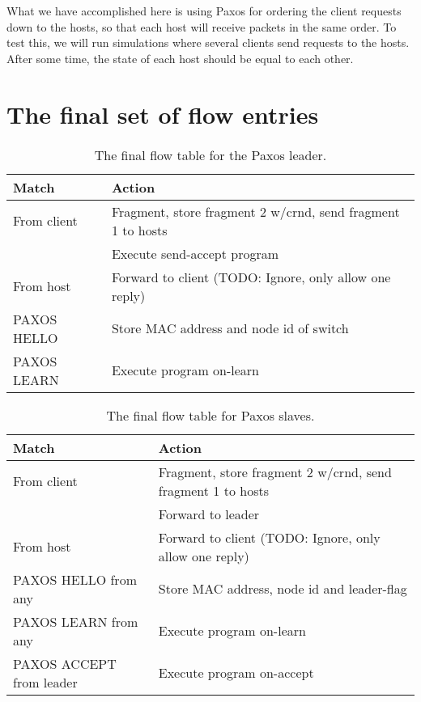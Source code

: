 What we have accomplished here is using Paxos for
ordering the client
requests down to the hosts, so that each host will receive packets in the
same order.  To test this, we will run simulations where several clients
send requests to the hosts. After some time, the state of each host should
be equal to each other.

\section{The final set of flow entries}
\label{chapter:final.flowtable}



\begin{table}[H]
  \centering
  \begin{tabular}{|l|l|}
    \hline \textbf{Match} & \textbf{Action} \\
    \hline From client & Fragment, store fragment 2 w/crnd, send fragment 1 to hosts \\
                       & Execute send-accept program \\
    \hline From host & Forward to client (TODO: Ignore, only allow one reply) \\
    \hline PAXOS HELLO & Store MAC address and node id of switch \\
    \hline PAXOS LEARN & Execute program on-learn \\
    \hline
  \end{tabular}
  \caption{The final flow table for the Paxos leader.}
  \label{table:complete.match.leader}
\end{table}

\begin{table}[H]
  \centering
  \begin{tabular}{|l|l|}
    \hline \textbf{Match} & \textbf{Action} \\
    \hline From client & Fragment, store fragment 2 w/crnd, send fragment 1 to hosts \\
                       & Forward to leader \\
    \hline From host & Forward to client (TODO: Ignore, only allow one reply) \\
    \hline PAXOS HELLO from any & Store MAC address, node id and leader-flag \\
    \hline PAXOS LEARN from any & Execute program on-learn \\
    \hline PAXOS ACCEPT from leader & Execute program on-accept \\
    \hline
  \end{tabular}
  \caption{The final flow table for Paxos slaves.}
  \label{table:complete.match.slave}
\end{table}

